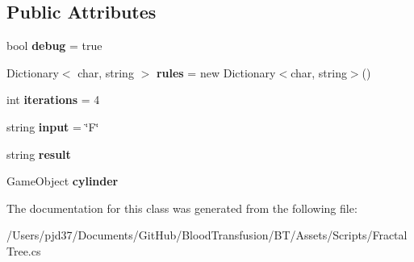 \subsection*{Public Attributes}
\begin{DoxyCompactItemize}
\item 
bool {\bfseries debug} = true\hypertarget{class_fractal_tree_ab02b549a7d12f89f03bb3e7bc95a8d9d}{}\label{class_fractal_tree_ab02b549a7d12f89f03bb3e7bc95a8d9d}

\item 
Dictionary$<$ char, string $>$ {\bfseries rules} = new Dictionary$<$char, string$>$()\hypertarget{class_fractal_tree_a2ff6b9cfe17440903da032d31207ccfc}{}\label{class_fractal_tree_a2ff6b9cfe17440903da032d31207ccfc}

\item 
int {\bfseries iterations} = 4\hypertarget{class_fractal_tree_ae0e4f5aef73b8586fd3cc3e6453d4b47}{}\label{class_fractal_tree_ae0e4f5aef73b8586fd3cc3e6453d4b47}

\item 
string {\bfseries input} = \char`\"{}F\char`\"{}\hypertarget{class_fractal_tree_a10507f9cce76de29638019dd21e23102}{}\label{class_fractal_tree_a10507f9cce76de29638019dd21e23102}

\item 
string {\bfseries result}\hypertarget{class_fractal_tree_a69247c15750d886cfbfa92fb074eb06e}{}\label{class_fractal_tree_a69247c15750d886cfbfa92fb074eb06e}

\item 
Game\+Object {\bfseries cylinder}\hypertarget{class_fractal_tree_a050a5ece9b29d633f23b4d170aeb7f69}{}\label{class_fractal_tree_a050a5ece9b29d633f23b4d170aeb7f69}

\end{DoxyCompactItemize}


The documentation for this class was generated from the following file\+:\begin{DoxyCompactItemize}
\item 
/\+Users/pjd37/\+Documents/\+Git\+Hub/\+Blood\+Transfusion/\+B\+T/\+Assets/\+Scripts/Fractal\+Tree.\+cs\end{DoxyCompactItemize}

